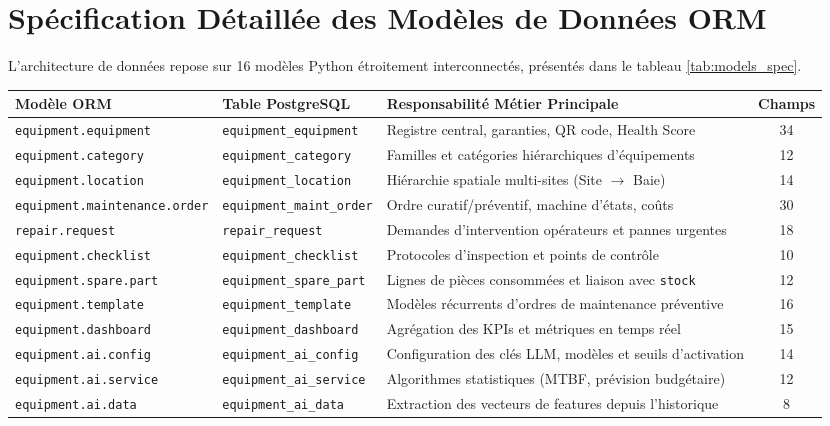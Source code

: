 \section{Spécification Détaillée des Modèles de Données ORM}
L'architecture de données repose sur 16 modèles Python étroitement interconnectés, présentés dans le tableau \ref{tab:models_spec}.

\begin{table}[!ht]
\centering
\small
\renewcommand{\arraystretch}{1.12}
\begin{tabularx}{\textwidth}{l l p{5.5cm} c}
\toprule
\textbf{Modèle ORM} & \textbf{Table PostgreSQL} & \textbf{Responsabilité Métier Principale} & \textbf{Champs} \\
\midrule
\texttt{equipment.equipment} & \texttt{equipment\_equipment} & Registre central, garanties, QR code, Health Score & 34 \\
\texttt{equipment.category} & \texttt{equipment\_category} & Familles et catégories hiérarchiques d'équipements & 12 \\
\texttt{equipment.location} & \texttt{equipment\_location} & Hiérarchie spatiale multi-sites (Site $\rightarrow$ Baie) & 14 \\
\texttt{equipment.maintenance.order} & \texttt{equipment\_maint\_order} & Ordre curatif/préventif, machine d'états, coûts & 30 \\
\texttt{repair.request} & \texttt{repair\_request} & Demandes d'intervention opérateurs et pannes urgentes & 18 \\
\texttt{equipment.checklist} & \texttt{equipment\_checklist} & Protocoles d'inspection et points de contrôle & 10 \\
\texttt{equipment.spare.part} & \texttt{equipment\_spare\_part} & Lignes de pièces consommées et liaison avec \texttt{stock} & 12 \\
\texttt{equipment.template} & \texttt{equipment\_template} & Modèles récurrents d'ordres de maintenance préventive & 16 \\
\texttt{equipment.dashboard} & \texttt{equipment\_dashboard} & Agrégation des KPIs et métriques en temps réel & 15 \\
\texttt{equipment.ai.config} & \texttt{equipment\_ai\_config} & Configuration des clés LLM, modèles et seuils d'activation & 14 \\
\texttt{equipment.ai.service} & \texttt{equipment\_ai\_service} & Algorithmes statistiques (MTBF, prévision budgétaire) & 12 \\
\texttt{equipment.ai.data} & \texttt{equipment\_ai\_data} & Extraction des vecteurs de features depuis l'historique & 8 \\

\end{tabularx}
\end{table}
